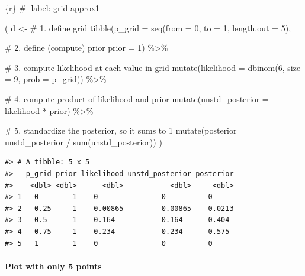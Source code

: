 \documentclass[
  letterpaper,
  DIV=11,
  numbers=noendperiod]{scrreprt}
\let\oldparagraph\paragraph
\renewcommand{\paragraph}[1]{\oldparagraph{#1}\mbox{}}
\newenvironment{Shaded}{\begin{snugshade}}{\end{snugshade}}
\newcommand{\AttributeTok}[1]{\textcolor[rgb]{0.40,0.45,0.13}{#1}}
\newcommand{\CommentTok}[1]{\textcolor[rgb]{0.37,0.37,0.37}{#1}}
\newcommand{\DecValTok}[1]{\textcolor[rgb]{0.68,0.00,0.00}{#1}}
\newcommand{\FunctionTok}[1]{\textcolor[rgb]{0.28,0.35,0.67}{#1}}
\newcommand{\InformationTok}[1]{\textcolor[rgb]{0.37,0.37,0.37}{#1}}
\newcommand{\NormalTok}[1]{\textcolor[rgb]{0.00,0.23,0.31}{#1}}
\newcommand{\OtherTok}[1]{\textcolor[rgb]{0.00,0.23,0.31}{#1}}
\newcommand{\SpecialCharTok}[1]{\textcolor[rgb]{0.37,0.37,0.37}{#1}}
\begin{document}
\begin{Shaded}
\begin{Highlighting}[]
\InformationTok{\textasciigrave{}\textasciigrave{}\textasciigrave{}\{r\}}
\CommentTok{\#| label: grid{-}approx1}

\NormalTok{(}
\NormalTok{  d }\OtherTok{\textless{}{-}}
    \CommentTok{\# 1. define grid}
    \FunctionTok{tibble}\NormalTok{(}\AttributeTok{p\_grid =} \FunctionTok{seq}\NormalTok{(}\AttributeTok{from =} \DecValTok{0}\NormalTok{, }\AttributeTok{to =} \DecValTok{1}\NormalTok{, }\AttributeTok{length.out =} \DecValTok{5}\NormalTok{), }
           
    \CommentTok{\# 2. define (compute) prior  }
           \AttributeTok{prior  =} \DecValTok{1}\NormalTok{) }\SpecialCharTok{\%\textgreater{}\%}
        
    \CommentTok{\# 3. compute likelihood at each value in grid}
    \FunctionTok{mutate}\NormalTok{(}\AttributeTok{likelihood =} \FunctionTok{dbinom}\NormalTok{(}\DecValTok{6}\NormalTok{, }\AttributeTok{size =} \DecValTok{9}\NormalTok{, }\AttributeTok{prob =}\NormalTok{ p\_grid)) }\SpecialCharTok{\%\textgreater{}\%} 
        
    \CommentTok{\# 4. compute product of likelihood and prior}
    \FunctionTok{mutate}\NormalTok{(}\AttributeTok{unstd\_posterior =}\NormalTok{ likelihood }\SpecialCharTok{*}\NormalTok{ prior) }\SpecialCharTok{\%\textgreater{}\%}  
        
    \CommentTok{\# 5. standardize the posterior, so it sums to 1}
    \FunctionTok{mutate}\NormalTok{(}\AttributeTok{posterior =}\NormalTok{ unstd\_posterior }\SpecialCharTok{/} \FunctionTok{sum}\NormalTok{(unstd\_posterior))   }
\NormalTok{)}
\InformationTok{\textasciigrave{}\textasciigrave{}\textasciigrave{}}
\end{Highlighting}
\end{Shaded}

\begin{verbatim}
#> # A tibble: 5 x 5
#>   p_grid prior likelihood unstd_posterior posterior
#>    <dbl> <dbl>      <dbl>           <dbl>     <dbl>
#> 1   0        1    0               0          0     
#> 2   0.25     1    0.00865         0.00865    0.0213
#> 3   0.5      1    0.164           0.164      0.404 
#> 4   0.75     1    0.234           0.234      0.575 
#> 5   1        1    0               0          0
\end{verbatim}

\hypertarget{plot-with-only-5-points}{%
\paragraph{Plot with only 5 points}\label{plot-with-only-5-points}}
\end{document}
